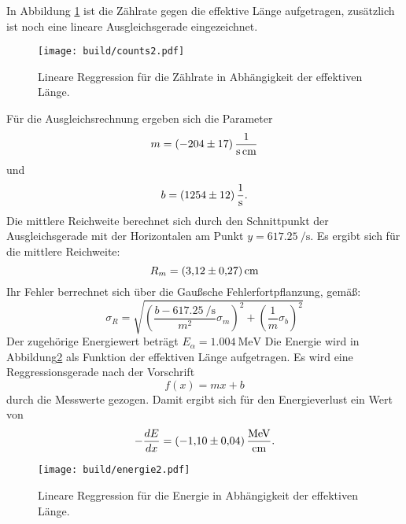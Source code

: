 \noindent In Abbildung \ref{fig:c2} ist die Zählrate gegen die effektive Länge aufgetragen, zusätzlich ist noch eine lineare Ausgleichsgerade eingezeichnet.
\begin{figure}[H]
  \centering
  \texttt{[image: build/counts2.pdf]}
  \caption{Lineare Reggression für die Zählrate in Abhängigkeit der effektiven Länge.}
  \label{fig:c2}
\end{figure}
\noindent Für die Ausgleichsrechnung ergeben sich die Parameter
\begin{equation*}
  m = \SI{-204\pm17}{\per\second\per\centi\meter}
\end{equation*}
und
\begin{equation*}
  b = \SI{1254\pm12}{\per\second}   .
\end{equation*}
Die mittlere Reichweite berechnet sich durch den Schnittpunkt der Ausgleichsgerade mit der Horizontalen am Punkt $y=\SI{617.25}{\per\second}$.
Es ergibt sich für die mittlere Reichweite:
\begin{equation}
  R_m= \SI{3.12\pm0.27}{\centi\meter}
\end{equation}
Ihr Fehler berrechnet sich über die Gaußsche Fehlerfortpflanzung, gemäß:
\begin{equation*}
    \sigma_R = \sqrt{\left(\frac{b-\SI{617.25}{\per\second}}{m^2}\sigma_m\right)^2 +\left(\frac{1}{m}\sigma_b\right)^2}
\end{equation*}
Der zugehörige Energiewert beträgt $E_{\alpha}=\SI{1.004}{\mega\electronvolt}$
Die Energie wird in Abbildung\ref{fig:e2} als Funktion der effektiven Länge aufgetragen.
Es wird eine Reggressionsgerade nach der Vorschrift
\begin{equation*}
  f(x) = mx + b
\end{equation*}
durch die Messwerte gezogen.
Damit ergibt sich für den Energieverlust ein Wert von
\begin{equation*}
  -\frac{dE}{dx} =\SI{-1.10\pm0.04}{\mega\electronvolt\per\centi\meter} .
\end{equation*}

\begin{figure}[H]
  \centering
  \texttt{[image: build/energie2.pdf]}
  \caption{Lineare Reggression für die Energie in Abhängigkeit der effektiven Länge.}
  \label{fig:e2}
\end{figure}

